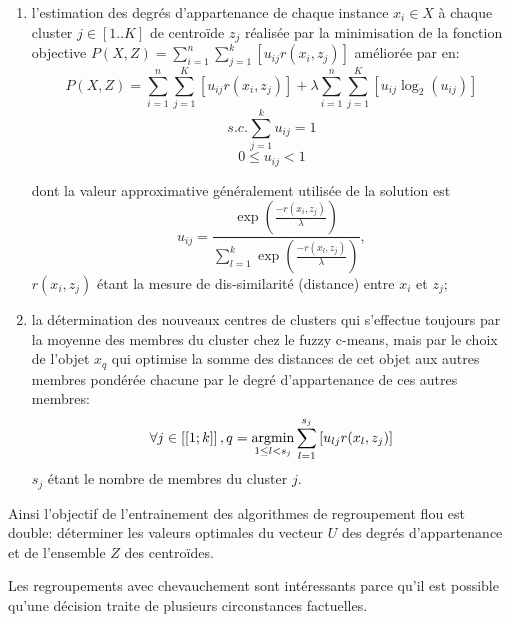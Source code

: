 \begin{enumerate}
 \item l'estimation des degrés d'appartenance de chaque instance $x_i \in X$ à chaque cluster $j \in [1..K]$ de centroïde $z_j$ réalisée par la minimisation de la fonction objective $P(X,Z) = \sum\limits_{i=1}^{n}\sum\limits_{j=1}^{k} \left[u_{ij}r(x_i,z_j)\right]$ \citep{krishnapuram2001fuzzycmedoids}  améliorée par \citet{sabzi2011fuzzykmedoids} en:
 \[P(X,Z) = \sum\limits_{i=1}^{n}\sum\limits_{j=1}^{K} \left[u_{ij}r(x_i,z_j)\right] + \lambda \sum\limits_{i=1}^{n}\sum\limits_{j=1}^{K} \left[ u_{ij}\log_2(u_{ij}) \right] \]
 \[s.c. \sum\limits_{j=1}^{k} u_{ij} = 1\]
 \[0 \leq u_{ij} < 1\]
 
 dont la valeur approximative généralement utilisée de la solution est \[u_{ij} = \frac{\exp\left(\frac{-r(x_i,z_j)}{\lambda}\right)}{\sum_{l=1}^{k}\exp\left(\frac{-r(x_l,z_j)}{\lambda}\right)},\] $r(x_i,z_j)$ étant la mesure de dis-similarité (distance) entre $x_i$ et  $z_j$;
 \item la détermination des nouveaux centres de clusters qui s'effectue toujours par la moyenne des membres du cluster chez le fuzzy c-means, mais par le choix de l'objet $x_q$ qui optimise la somme des distances de cet objet aux autres membres pondérée chacune par le degré d'appartenance de ces autres membres: \[\forall j \in \left[ \left[1;k \right] \right], q = \mathop{\mathrm{argmin}}\limits\limits_{1 \leq l < s_j} \sum\limits_{l=1}^{s_j} \left[u_{lj}r(x_l,z_j)\right]\] $s_j$ étant le nombre de membres du cluster $j$.
\end{enumerate}
 Ainsi l'objectif de l'entrainement des algorithmes de regroupement flou est double: déterminer les valeurs optimales du vecteur  $U$ des degrés d'appartenance et de l'ensemble $Z$ des centroïdes. 
 
 Les regroupements avec chevauchement sont intéressants parce qu'il est possible qu'une décision traite de plusieurs circonstances factuelles.

